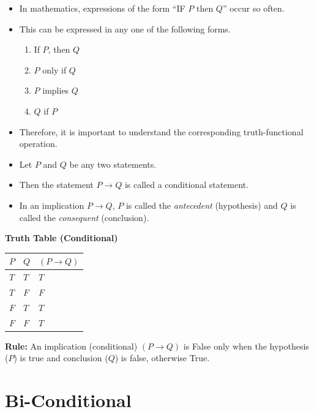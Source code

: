 \documentclass[]{book}
\providecommand{\tightlist}{%
  \setlength{\itemsep}{0pt}\setlength{\parskip}{0pt}}
\begin{document}
\begin{itemize}
\tightlist
\item
  In mathematics, expressions of the form ``IF \(P\) then \(Q\)'' occur so often.
\item
  This can be expressed in any one of the following forms.

  \begin{enumerate}
  \def\labelenumi{\alph{enumi})}
  \tightlist
  \item
    If \(P\), then \(Q\)
  \item
    \(P\) only if \(Q\)
  \item
    \(P\) implies \(Q\)
  \item
    \(Q\) if \(P\)
  \end{enumerate}
\item
  Therefore, it is important to understand the corresponding truth-functional operation.
\item
  Let \(P\) and \(Q\) be any two statements.
\item
  Then the statement \(P \rightarrow Q\) is called a conditional statement.
\item
  In an implication \(P \rightarrow Q\), \(P\) is called the \emph{antecedent} (hypothesis) and \(Q\) is called the \emph{consequent} (conclusion).
\end{itemize}

\textbf{Truth Table (Conditional)}

\begin{longtable}[]{@{}lll@{}}
\toprule
\(P\) & \(Q\) & \((P \rightarrow Q)\)\tabularnewline
\midrule
\endhead
\(T\) & \(T\) & \(T\)\tabularnewline
\(T\) & \(F\) & \(F\)\tabularnewline
\(F\) & \(T\) & \(T\)\tabularnewline
\(F\) & \(F\) & \(T\)\tabularnewline
\bottomrule
\end{longtable}

\textbf{Rule:} An implication (conditional) \((P \rightarrow Q)\) is False only when the hypothesis (\(P\)) is true and conclusion (\(Q\)) is false, otherwise True.

\hypertarget{bi-conditional}{%
\section{Bi-Conditional}\label{bi-conditional}}
\end{document}
